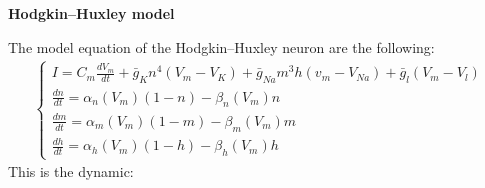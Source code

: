 \documentclass{report}
\begin{document}
	\begin{center}
		\textbf{\huge Hodgkin–Huxley model}
	\end{center}
	The model equation of the Hodgkin–Huxley neuron are the following:
	\begin{eqnarray}
		\begin{cases}
			I = C_m\frac{dV_m}{dt} + \bar{g}_Kn^4(V_m - V_K) + \bar{g}_{Na}m^3h(v_m - V_{Na}) + \bar{g}_l(V_m - V_l) \\
			\frac{dn}{dt} = \alpha_n(V_m)(1 - n) - \beta_n(V_m)n \\
			\frac{dm}{dt} = \alpha_m(V_m)(1 - m) - \beta_m(V_m)m \\
			\frac{dh}{dt} = \alpha_h(V_m)(1 - h) - \beta_h(V_m)h
		\end{cases}	
	\end{eqnarray}
	This is the dynamic:
	
\end{document}
